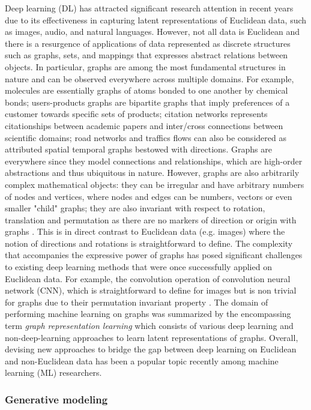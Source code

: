 Deep learning (DL) has attracted significant research attention in recent years
due to its effectiveness in capturing latent representations of Euclidean data,
such as images, audio, and natural languages. However, not all data is Euclidean
and there is a resurgence of applications of data represented as discrete
structures such as graphs, sets, and mappings that expresses abstract relations
between objects. In particular, graphs are among the most fundamental structures
in nature and can be observed everywhere across multiple domains. For example,
molecules are essentially graphs of atoms bonded to one another by chemical
bonds; users-products graphs are bipartite graphs that imply preferences of a
customer towards specific sets of products; citation networks represents
citationships between academic papers and inter/cross connections between
scientific domains; road networks and traffics flows can also be considered as
attributed spatial temporal graphs bestowed with directions. Graphs are
everywhere since they model connections and relationships, which are high-order
abstractions and thus ubiquitous in nature. However, graphs are also arbitrarily
complex mathematical objects: they can be irregular and have arbitrary numbers
of nodes and vertices, where nodes and edges can be numbers, vectors or even
smaller "child" graphs; they are also invariant with respect to rotation,
translation and permutation as there are no markers of direction or origin with
graphs \citep{bronsteinGeometricDeepLearning2017}. This is in direct contrast to
Euclidean data (e.g. images) where the notion of directions and rotations is
straightforward to define. The complexity that accompanies the expressive power
of graphs has posed significant challenges to existing deep learning methods
that were once successfully applied on Euclidean data. For example, the
convolution operation of convolution neural network (CNN), which is
straightforward to define for images but is non trivial for graphs due to their
permutation invariant property \citep{wuComprehensiveSurveyGraph2021}. The
domain of performing machine learning on graphs was summarized by the
encompassing term \textit{graph representation learning} which consists of
various deep learning and non-deep-learning approaches to learn latent
representations of graphs. Overall, devising new approaches to bridge the gap
between deep learning on Euclidean and non-Euclidean data has been a popular
topic recently among machine learning (ML) researchers.

\subsubsection{Generative modeling}

